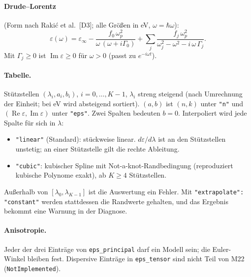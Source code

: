 \paragraph{Drude--Lorentz} (Form nach Raki\'c et al.\ [D3]; alle Größen in eV, $\omega=\hbar\omega$):
\begin{equation}\label{eq:disp_dl}
  \varepsilon(\omega)=\varepsilon_\infty-\frac{f_0\,\omega_p^2}{\omega\,(\omega+i\Gamma_0)}
  +\sum_j\frac{f_j\,\omega_p^2}{\omega_j^2-\omega^2-i\,\omega\,\Gamma_j}.
\end{equation}
Mit $\Gamma_j\ge0$ ist $\operatorname{Im}\varepsilon\ge0$ für $\omega>0$ (passt zu $e^{-i\omega t}$).

\paragraph{Tabelle.} Stützstellen $(\lambda_i,a_i,b_i)$, $i=0,\dots,K-1$, $\lambda_i$ streng steigend (nach
Umrechnung der Einheit; bei eV wird absteigend sortiert). $(a,b)$ ist $(n,k)$ unter \verb|"n"| und
$(\operatorname{Re}\varepsilon,\operatorname{Im}\varepsilon)$ unter \verb|"eps"|. Zwei Spalten bedeuten $b=0$.
Interpoliert wird jede Spalte für sich in $\lambda$:
\begin{itemize}[nosep]
  \item \verb|"linear"| (Standard): stückweise linear. $d\varepsilon/d\lambda$ ist an den Stützstellen unstetig; an
        einer Stützstelle gilt die rechte Ableitung.
  \item \verb|"cubic"|: kubischer Spline mit Not-a-knot-Randbedingung (reproduziert kubische Polynome exakt), ab
        $K\ge4$ Stützstellen.
\end{itemize}
Außerhalb von $[\lambda_0,\lambda_{K-1}]$ ist die Auswertung ein Fehler. Mit \verb|"extrapolate": "constant"|
werden stattdessen die Randwerte gehalten, und das Ergebnis bekommt eine Warnung in der Diagnose.

\paragraph{Anisotropie.} Jeder der drei Einträge von \verb|eps_principal| darf ein Modell sein; die Euler-Winkel
bleiben fest. Dispersive Einträge in \verb|eps_tensor| sind nicht Teil von M22 (\verb|NotImplemented|).

